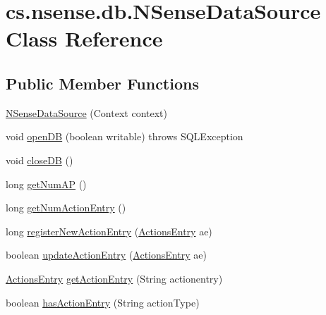 \hypertarget{classcs_1_1nsense_1_1db_1_1_n_sense_data_source}{\section{cs.\-nsense.\-db.\-N\-Sense\-Data\-Source Class Reference}
\label{classcs_1_1nsense_1_1db_1_1_n_sense_data_source}
}
\subsection*{Public Member Functions}
\begin{DoxyCompactItemize}
\item 
\hyperlink{classcs_1_1nsense_1_1db_1_1_n_sense_data_source_a971a5999e930c02a97ba8d5fc3cf36eb}{N\-Sense\-Data\-Source} (Context context)
\item 
void \hyperlink{classcs_1_1nsense_1_1db_1_1_n_sense_data_source_a25d707eaa12c97073480515dc668e287}{open\-D\-B} (boolean writable)  throws S\-Q\-L\-Exception 
\item 
void \hyperlink{classcs_1_1nsense_1_1db_1_1_n_sense_data_source_a58abdd7251a792b635dc9c31ee75a212}{close\-D\-B} ()
\item 
long \hyperlink{classcs_1_1nsense_1_1db_1_1_n_sense_data_source_ac9026cc14facfb5c7dc1c59e47a6aa50}{get\-Num\-A\-P} ()
\item 
long \hyperlink{classcs_1_1nsense_1_1db_1_1_n_sense_data_source_a070a88ac74e5eff01a58c8dac5b0f4ce}{get\-Num\-Action\-Entry} ()
\item 
long \hyperlink{classcs_1_1nsense_1_1db_1_1_n_sense_data_source_a0d8a9b42375bb84227b1799662ce5e8f}{register\-New\-Action\-Entry} (\hyperlink{classcs_1_1nsense_1_1accelerometer_1_1_actions_entry}{Actions\-Entry} ae)
\item 
boolean \hyperlink{classcs_1_1nsense_1_1db_1_1_n_sense_data_source_acea50f4350f3e408982ab0a024cc19ee}{update\-Action\-Entry} (\hyperlink{classcs_1_1nsense_1_1accelerometer_1_1_actions_entry}{Actions\-Entry} ae)
\item 
\hyperlink{classcs_1_1nsense_1_1accelerometer_1_1_actions_entry}{Actions\-Entry} \hyperlink{classcs_1_1nsense_1_1db_1_1_n_sense_data_source_abbcbe7f0adaa19e47fc5e033de618d20}{get\-Action\-Entry} (String actionentry)
\item 
boolean \hyperlink{classcs_1_1nsense_1_1db_1_1_n_sense_data_source_a3c89a9f731e64b76e722693d6e8d4ba4}{has\-Action\-Entry} (String action\-Type)
\item 

\end{DoxyCompactItemize}

